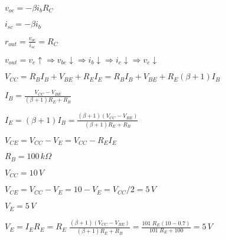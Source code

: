\documentclass{article}
\def\lthtmlcheckvsize{\ifdim\ht\sizebox<\vsize 
  \ifdim\wd\sizebox<\hsize\expandafter\hfill\fi \expandafter\vfill
  \else\expandafter\vss\fi}%
\begin{document}
{\newpage\clearpage
{}%
$ v_{oc}=-\beta i_b R_C$%
\lthtmlindisplaymathZ
\lthtmlcheckvsize\clearpage}

{\newpage\clearpage
{}%
$ i_{sc}=-\beta i_b$%
\lthtmlindisplaymathZ
\lthtmlcheckvsize\clearpage}

{\newpage\clearpage
{}%
$\displaystyle r_{out}=\frac{v_{oc}}{i_{sc}}=R_C$%
\lthtmlindisplaymathZ
\lthtmlcheckvsize\clearpage}

{\newpage\clearpage
{}%
$\displaystyle v_{out}=v_e\uparrow \Longrightarrow v_{be} \downarrow \Longrightarrow
i_b \downarrow \Longrightarrow i_c \downarrow \Longrightarrow
v_e\downarrow$%
\lthtmlindisplaymathZ
\lthtmlcheckvsize\clearpage}

{\newpage\clearpage
{}%
$\displaystyle V_{CC}=R_B I_B+V_{BE}+R_E I_E=R_B I_B+V_{BE}+R_E (\beta+1)I_B$%
\lthtmlindisplaymathZ
\lthtmlcheckvsize\clearpage}

{\newpage\clearpage
{}%
$\displaystyle I_B=\frac{V_{CC}-V_{BE}}{(\beta+1)R_E+R_B}$%
\lthtmlindisplaymathZ
\lthtmlcheckvsize\clearpage}

{\newpage\clearpage
{}%
$\displaystyle I_E=(\beta+1) I_B=\frac{(\beta+1)(V_{CC}-V_{BE})}{(\beta+1)R_E+R_B}$%
\lthtmlindisplaymathZ
\lthtmlcheckvsize\clearpage}

{\newpage\clearpage
{}%
$\displaystyle V_{CE}=V_{CC}-V_E=V_{CC}-R_E I_E$%
\lthtmlindisplaymathZ
\lthtmlcheckvsize\clearpage}

{\newpage\clearpage
{}%
$ R_B=100\,k\Omega$%
\lthtmlindisplaymathZ
\lthtmlcheckvsize\clearpage}

{\newpage\clearpage
{}%
$ V_{CC}=10\,V$%
\lthtmlindisplaymathZ
\lthtmlcheckvsize\clearpage}

{\newpage\clearpage
{}%
$ V_{CE}=V_{CC}-V_E=10-V_E=V_{CC}/2=5\,V$%
\lthtmlindisplaymathZ
\lthtmlcheckvsize\clearpage}

{\newpage\clearpage
{}%
$ V_E=5\,V$%
\lthtmlindisplaymathZ
\lthtmlcheckvsize\clearpage}

{\newpage\clearpage
{}%
$\displaystyle V_E=I_E R_E =R_E\;\frac{(\beta+1) (V_{CC}-V_{BE})}{(\beta+1)R_E+R_B}
=\frac{101\;R_E(10-0.7)}{101\;R_E+100}=5\,V$%
\lthtmlindisplaymathZ
\lthtmlcheckvsize\clearpage}
\end{document}
